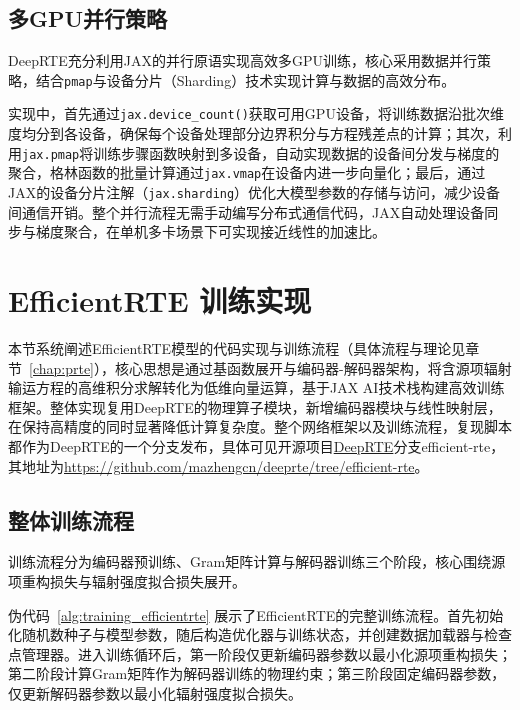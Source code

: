 \subsection{多GPU并行策略}

DeepRTE充分利用JAX的并行原语实现高效多GPU训练，核心采用数据并行策略，结合\texttt{pmap}与设备分片（Sharding）技术实现计算与数据的高效分布。

实现中，首先通过\texttt{jax.device\_count()}获取可用GPU设备，将训练数据沿批次维度均分到各设备，确保每个设备处理部分边界积分与方程残差点的计算；其次，利用\texttt{jax.pmap}将训练步骤函数映射到多设备，自动实现数据的设备间分发与梯度的聚合，格林函数的批量计算通过\texttt{jax.vmap}在设备内进一步向量化；最后，通过JAX的设备分片注解（\texttt{jax.sharding}）优化大模型参数的存储与访问，减少设备间通信开销。整个并行流程无需手动编写分布式通信代码，JAX自动处理设备同步与梯度聚合，在单机多卡场景下可实现接近线性的加速比。

\section{EfficientRTE 训练实现}

本节系统阐述EfficientRTE模型的代码实现与训练流程（具体流程与理论见章节~\ref{chap:prte}），核心思想是通过基函数展开与编码器-解码器架构，将含源项辐射输运方程的高维积分求解转化为低维向量运算，基于JAX AI技术栈构建高效训练框架。整体实现复用DeepRTE的物理算子模块，新增编码器模块与线性映射层，在保持高精度的同时显著降低计算复杂度。整个网络框架以及训练流程，复现脚本都作为DeepRTE的一个分支发布，具体可见开源项目\href{https://github.com/mazhengcn/deeprte/tree/efficient-rte}{DeepRTE}分支efficient-rte，
其地址为\url{https://github.com/mazhengcn/deeprte/tree/efficient-rte}。

\subsection{整体训练流程}

训练流程分为编码器预训练、Gram矩阵计算与解码器训练三个阶段，核心围绕源项重构损失与辐射强度拟合损失展开。

伪代码~\ref{alg:training_efficientrte} 展示了EfficientRTE的完整训练流程。首先初始化随机数种子与模型参数，随后构造优化器与训练状态，并创建数据加载器与检查点管理器。进入训练循环后，第一阶段仅更新编码器参数以最小化源项重构损失；第二阶段计算Gram矩阵作为解码器训练的物理约束；第三阶段固定编码器参数，仅更新解码器参数以最小化辐射强度拟合损失。

